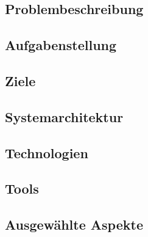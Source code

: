 \begin{spacing}{1}
\chapter{Problembeschreibung}
\end{spacing}


\begin{spacing}{1}
\chapter{Aufgabenstellung}
\end{spacing}


\begin{spacing}{1}
\chapter{Ziele}
\end{spacing}


\begin{spacing}{1}
\chapter{Systemarchitektur}
\end{spacing}


\begin{spacing}{1}
\chapter{Technologien}\label{chapter:tech}
\end{spacing}


\begin{spacing}{1}
\chapter{Tools}\label{chapter:tech}
\end{spacing}


\begin{spacing}{1}
\chapter{Ausgewählte Aspekte}
\end{spacing}



